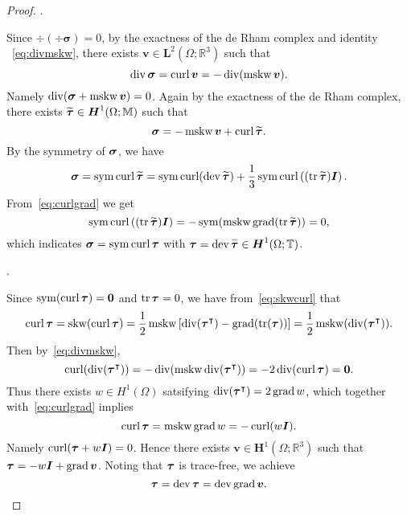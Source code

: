 \begin{proof}
\medskip
{}. 

Since $\div(\div\boldsymbol \sigma) = 0$, by the exactness of the de Rham complex and identity ~\eqref{eq:divmskw},  there exists $\boldsymbol v \in\boldsymbol L^2(\Omega;\mathbb R^3)$ such that
\[
\div\bs\sigma=\curl\boldsymbol v=-\div(\mskw\boldsymbol v).
\]
Namely $\div (\boldsymbol \sigma + \mskw\boldsymbol v) = 0$. Again by the exactness of the de Rham complex, there exists $\widetilde{\bs\tau} \in\boldsymbol H^1(\Omega;\mathbb M)$ such that
\[
\bs\sigma=-\mskw\boldsymbol v+\curl\widetilde{\bs\tau}.
\]
By the symmetry of $\bs\sigma$, we have
$$
\bs\sigma=\sym\curl\widetilde{\bs\tau}=\sym\curl(\dev\widetilde{\bs\tau})+\frac{1}{3}\sym\curl\left((\tr\widetilde{\bs\tau})\boldsymbol I\right).
$$
From~\eqref{eq:curlgrad} we get
$$
\sym\curl\left((\tr\widetilde{\bs\tau})\boldsymbol I\right)=-\sym(\mskw\grad(\tr\widetilde{\bs\tau}))=0,
$$
which indicates $\bs\sigma=\sym\curl\bs\tau$ with $\bs\tau=\dev\widetilde{\bs\tau}\in\boldsymbol H^1(\Omega;\mathbb T)$. 

\medskip
{}. 


Since $\sym(\curl\boldsymbol \tau)= \boldsymbol 0$ and $\tr\bs\tau=0$, we have from~\eqref{eq:skwcurl} that
\[
\curl\bs\tau=\skw(\curl\bs\tau)=\frac{1}{2}\mskw\left[\div(\bs\tau^{\intercal})-\grad(\tr(\bs\tau))\right]=\frac{1}{2}\mskw(\div(\bs\tau^{\intercal})).
\]
Then by~\eqref{eq:divmskw},
\[
\curl(\div(\bs\tau^{\intercal}))=-\div(\mskw\div(\bs\tau^{\intercal}))=-2\div(\curl\bs\tau)=\bs0.
\]
Thus there exists $w\in H^1(\Omega)$ satsifying $\div(\bs\tau^{\intercal})=2\grad w$, which together with~\eqref{eq:curlgrad} implies
\[
\curl\bs\tau=\mskw\grad w=-\curl(w\boldsymbol I).
\]
Namely $\curl (\boldsymbol \tau + w\boldsymbol I) = 0$. Hence there exists $\boldsymbol v\in \boldsymbol H^1(\Omega;\mathbb R^3)$ such that $\bs\tau=-w\boldsymbol I+\grad \boldsymbol v$. Noting that $\bs\tau$ is trace-free, we achieve
\[
\bs\tau=\dev\bs\tau=\dev\grad \boldsymbol v.
\]


\end{proof}
